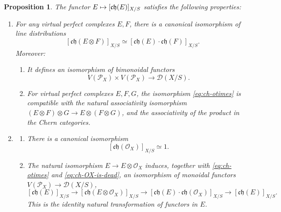 \documentclass[JEP,XML,SOM,Unicode,published]{cedram}
\newcommand\mto{\mathchoice{\longmapsto}{\mapsto}{\mapsto}{\mapsto}}
\theoremstyle{plain}
\newtheorem{proposition}[theorem]{Proposition}
\theoremstyle{definition}
\newcommand{\Dcal}{\mathcal D}
\newcommand{\Ocal}{\mathcal O}
\newcommand{\Pcal}{\mathcal P}
\newcommand{\chfrak}{\mathfrak {ch}}
\begin{document}
\begin{proposition}\label{prop:ch-multiplicative-properties}
The functor $E\mto[\chfrak(E)]_{X/S}$ satisfies the following properties:
\begin{enumerate}
\item\label{item:chernsequence-5} For any virtual perfect complexes $E, F$, there is a canonical isomorphism of line distributions
\begin{equation}\label{eq:ch-otimes}
[\chfrak(E \otimes F)]_{X/S} \simeq [\chfrak(E) \cdot \chfrak(F)]_{X/S}.
\end{equation}
Moreover:
\begin{enumerate}
\item\label{eq:ch-otimes-a} It defines an isomorphism of bimonoidal functors
\[
V(\Pcal_{X})\times V(\Pcal_{X})\to\Dcal(X/S).
\]
\item For virtual perfect complexes $E,F,G$, the isomorphism \eqref{eq:ch-otimes} is compatible with the natural associativity isomorphism $(E\otimes F)\otimes G\to E\otimes (F\otimes G)$, and the associativity of the product in the Chern categories.
\end{enumerate}

\item \label{item:ch-is-the-unit}
\begin{enumerate}
\item\label{item:ch-acts-trivially} There is a canonical isomorphism
\begin{equation}\label{eq:ch-OX-is-dead}
[ \chfrak(\Ocal_{X}) ]_{X/S} \simeq 1.
\end{equation}
\item The natural isomorphism $E \to E \otimes \Ocal_X$ induces, together with \eqref{eq:ch-otimes} and \eqref{eq:ch-OX-is-dead}, an isomorphism of monoidal functors $V(\Pcal_X) \to \Dcal(X/S)$,
\begin{equation}\label{eq:OX-not-dead-yet}
[ \chfrak(E) ]_{X/S} \to [ \chfrak(E \otimes \Ocal_X) ]_{X/S} \to [\chfrak(E)\cdot \chfrak(\Ocal_X) ]_{X/S} \to [\chfrak(E)]_{X/S}.
\end{equation}
This is the identity natural transformation of functors in $E$.
\end{enumerate}

\end{enumerate}
\end{proposition}
\end{document}
